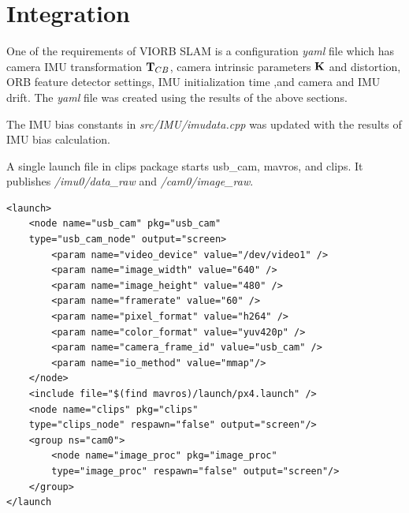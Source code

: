 \section{Integration}
One of the requirements of VIORB SLAM is a configuration \textit{yaml} file which has camera IMU transformation ${\bf T}_{CB}$, camera intrinsic parameters ${\bf K}$ and distortion, ORB feature detector settings, IMU initialization time ,and camera and IMU drift. The \textit{yaml} file was created using the results of the above sections.

The IMU bias constants in \textit{src/IMU/imudata.cpp} was updated with the results of IMU bias calculation.


A single launch file in clips package starts usb\_cam, mavros, and clips. It publishes \textit{/imu0/data\_raw} and \textit{/cam0/image\_raw}. 

\begin{lstlisting}
<launch>                                                                                                               
	<node name="usb_cam" pkg="usb_cam" 
	type="usb_cam_node" output="screen>                                             
		<param name="video_device" value="/dev/video1" />                                                                  
		<param name="image_width" value="640" />                                                                           
		<param name="image_height" value="480" />                                                                          
		<param name="framerate" value="60" />                                                                              
		<param name="pixel_format" value="h264" />                                                                         
		<param name="color_format" value="yuv420p" />                                                                      
		<param name="camera_frame_id" value="usb_cam" />                                                                   
		<param name="io_method" value="mmap"/>                                                                             
	</node>                                                                                                              
	<include file="$(find mavros)/launch/px4.launch" />                                                                  
	<node name="clips" pkg="clips" 
	type="clips_node" respawn="false" output="screen"/>                                  
	<group ns="cam0">                                                                                                    
		<node name="image_proc" pkg="image_proc"
		type="image_proc" respawn="false" output="screen"/>                       
	</group>                                                                                                             
</launch
\end{lstlisting}

